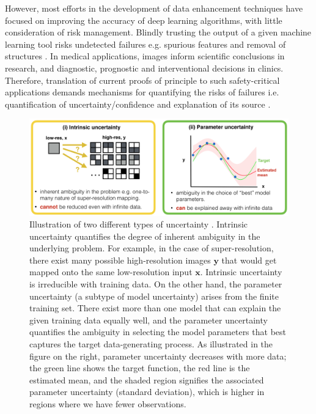 However,  most efforts in the development of data enhancement techniques have focused on improving the accuracy of deep learning algorithms, with little consideration of risk management. Blindly trusting the output of a given machine learning tool risks undetected failures e.g. spurious features and removal of structures \cite{cohen2018distribution}. In medical applications, images inform scientific conclusions in research, and diagnostic, prognostic and interventional decisions in clinics. Therefore, translation of current proofs of principle to such safety-critical applications demands mechanisms for quantifying the risks of failures i.e. quantification of uncertainty/confidence and explanation of its source \cite{begoli2019need}. 

\begin{figure}[t]
	\includegraphics[width=0.95\linewidth]{chapter_3/figures/fig_intro.png}
	\centering	
	\caption{Illustration of two different types of uncertainty \cite{hora1996aleatory}. Intrinsic uncertainty \cite{wang1996intrinsic} quantifies the degree of inherent ambiguity in the underlying problem. For example, in the case of super-resolution, there exist many possible high-resolution images $\textbf{y}$ that would get mapped onto the same low-resolution input $\textbf{x}$. Intrinsic uncertainty is irreducible with training data. On the other hand, the parameter uncertainty \cite{draper1995assessment} (a subtype of model uncertainty) arises from the finite training set. There exist more than one model that can explain the given training data equally well, and the parameter uncertainty quantifies the ambiguity in selecting the model parameters that best captures the target data-generating process. As illustrated in the figure on the right, parameter uncertainty decreases with more data; the green line shows the target function, the red line is the estimated mean, and the shaded region signifies the associated parameter uncertainty (standard deviation), which is higher in regions where we have fewer observations.} 
	\label{fig:uncertainty_types}
\end{figure}

